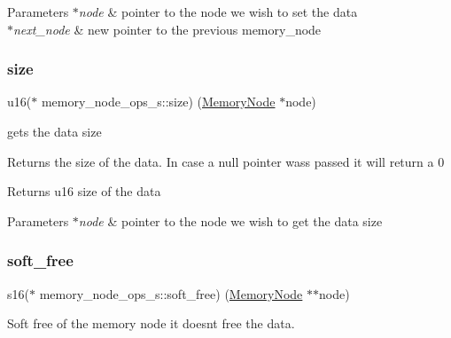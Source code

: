 \begin{DoxyParams}{Parameters}
{\em $\ast$node} & pointer to the node we wish to set the data \\
\hline
{\em $\ast$next\+\_\+node} & new pointer to the previous memory\+\_\+node \\
\hline
\end{DoxyParams}
\mbox{\label{structmemory__node__ops__s_aac6e0ccb9192cefc1fc6ec9826a11f90}} 
\subsubsection{\texorpdfstring{size}{size}}
{\footnotesize\ttfamily u16($\ast$ memory\+\_\+node\+\_\+ops\+\_\+s\+::size) (\hyperlink{structmemory__node__s}{Memory\+Node} $\ast$node)}



gets the data size 

Returns the size of the data. In case a null pointer wass passed it will return a 0

\begin{DoxyReturn}{Returns}
u16 size of the data 
\end{DoxyReturn}

\begin{DoxyParams}{Parameters}
{\em $\ast$node} & pointer to the node we wish to get the data size \\
\hline
\end{DoxyParams}
\mbox{\label{structmemory__node__ops__s_a51993e6d5aeb1025181ba5ae46e9f0a8}} 
\subsubsection{\texorpdfstring{soft\+\_\+free}{soft\_free}}
{\footnotesize\ttfamily s16($\ast$ memory\+\_\+node\+\_\+ops\+\_\+s\+::soft\+\_\+free) (\hyperlink{structmemory__node__s}{Memory\+Node} $\ast$$\ast$node)}



Soft free of the memory node it doesn\textquotesingle{}t free the data. 

